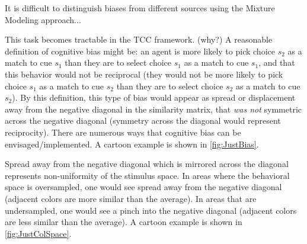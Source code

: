 
It is difficult to distinguish biases from different sources using the Mixture Modeling approach... %

This task becomes tractable in the TCC framework. (why?)
A reasonable definition of cognitive bias might be: an agent is more likely to pick choice $s_2$ as a match to cue $s_1$ than they are to select choice $s_1$ as a match to cue $s_1$, and that this behavior would not be reciprocal (they would not be more likely to pick choice $s_1$ as a match to cue $s_2$ than they are to select choice $s_2$ as a match to cue $s_2$).
By this definition, this type of bias would appear as spread or displacement away from the negative diagonal in the similarity matrix, that \emph{was not} symmetric across the negative diagonal (symmetry across the diagonal would represent reciprocity).
There are numerous ways that cognitive bias can be envisaged/implemented.
A cartoon example is shown in \autoref{fig:JustBias}.

Spread away from the negative diagonal which is mirrored across the diagonal represents non-uniformity of the stimulus space.
In areas where the behavioral space is oversampled, one would see spread away from the negative diagonal (adjacent colors are more similar than the average).
In areas that are undersampled, one would see a pinch into the negative diagonal (adjacent colors are less similar than the average).
A cartoon example is shown in \autoref{fig:JustColSpace}.

